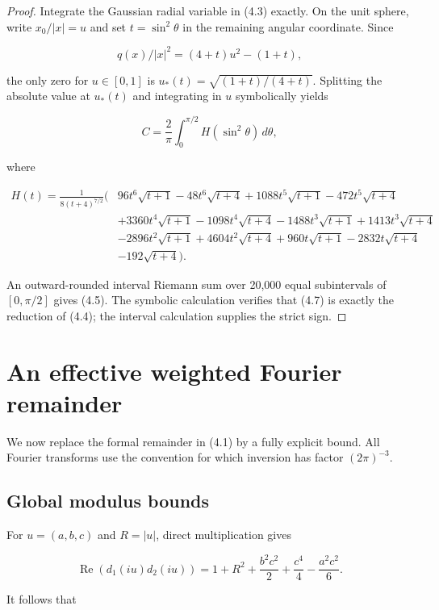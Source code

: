 \documentclass[11pt]{article}
\begin{document}
\begin{proof}
Integrate the Gaussian radial variable in (4.3) exactly.  On the unit sphere, write $x_0/|x|=u$ and set $t=\sin^2\theta$ in the remaining angular coordinate.  Since

\[
q(x)/|x|^2=(4+t)u^2-(1+t),
\]

the only zero for $u\in[0,1]$ is $u_*(t)=\sqrt{(1+t)/(4+t)}$.  Splitting the absolute value at $u_*(t)$ and integrating in $u$ symbolically yields

\[
C=\frac2\pi\int_0^{\pi/2}H(\sin^2\theta)\,d\theta,      \tag{4.6}
\]

where

\[
\begin{aligned}
H(t)=\frac1{8(t+4)^{7/2}}\bigl(&96t^6\sqrt{t+1}-48t^6\sqrt{t+4}
+1088t^5\sqrt{t+1}-472t^5\sqrt{t+4}\\
&+3360t^4\sqrt{t+1}-1098t^4\sqrt{t+4}
-1488t^3\sqrt{t+1}+1413t^3\sqrt{t+4}\\
&-2896t^2\sqrt{t+1}+4604t^2\sqrt{t+4}
+960t\sqrt{t+1}-2832t\sqrt{t+4}\\
&-192\sqrt{t+4}\bigr).
\end{aligned}                                            \tag{4.7}
\]

An outward-rounded interval Riemann sum over 20,000 equal subintervals of $[0,\pi/2]$ gives (4.5).  The symbolic calculation verifies that (4.7) is exactly the reduction of (4.4); the interval calculation supplies the strict sign.

\end{proof}

\section{An effective weighted Fourier remainder}

We now replace the formal remainder in (4.1) by a fully explicit bound.  All Fourier transforms use the convention for which inversion has factor $(2\pi)^{-3}$.

\subsection{Global modulus bounds}

For $u=(a,b,c)$ and $R=|u|$, direct multiplication gives

\[
\operatorname{Re}(d_1(iu)d_2(iu))
=1+R^2+\frac{b^2c^2}{2}+\frac{c^4}{4}-\frac{a^2c^2}{6}. \tag{5.1}
\]

It follows that
\end{document}
